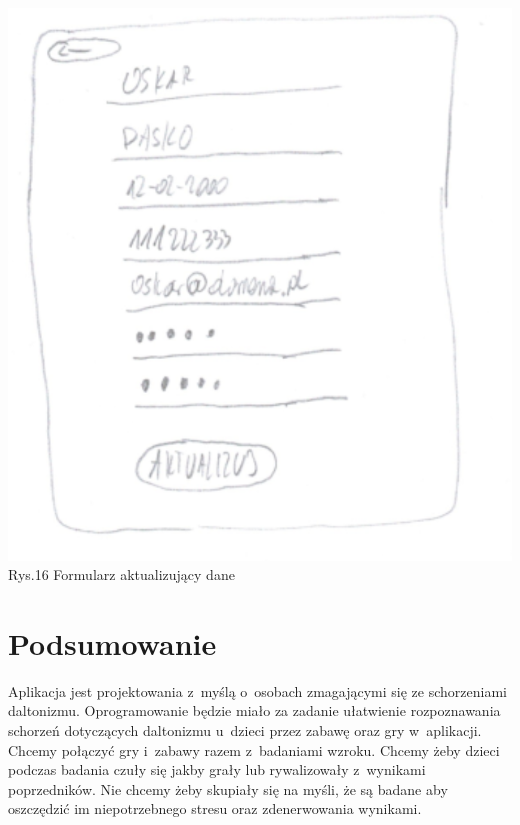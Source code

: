 \documentclass[12pt, letterpaper]{article}
\begin{document}
		\begin{center}
			\includegraphics[scale=0.5]{GUI_zmiana_danych}\\
			\caption{Rys.16 Formularz aktualizujący dane}
		\end{center}
		

		\section{Podsumowanie}
		
		Aplikacja jest projektowania z~myślą o~osobach zmagającymi się ze schorzeniami daltonizmu. Oprogramowanie będzie miało za zadanie ułatwienie rozpoznawania schorzeń dotyczących daltonizmu u~dzieci przez zabawę oraz gry w~aplikacji. Chcemy połączyć gry i~zabawy razem z~badaniami wzroku. Chcemy żeby dzieci podczas badania czuły się jakby grały lub rywalizowały z~wynikami poprzedników. Nie chcemy żeby skupiały się na myśli, że są badane aby oszczędzić im niepotrzebnego stresu oraz zdenerwowania wynikami.
 
\end{document}
